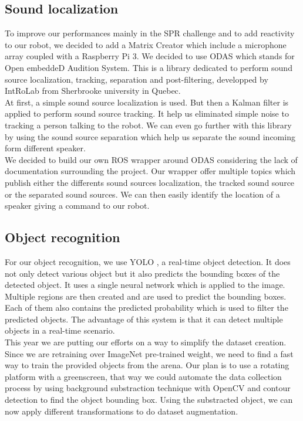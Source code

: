 \documentclass[runningheads,a4paper]{llncs}
\begin{document}
\subsection{Sound localization}
\tab To improve our performances mainly in the SPR challenge and to add reactivity to our robot, we decided to add a Matrix Creator which include a microphone array coupled with a Raspberry Pi 3. We decided to use ODAS  \cite{ODAS} which stands for Open embeddeD Audition System. This is a library dedicated to perform sound source localization, tracking, separation and post-filtering, developped by IntRoLab\cite{Introlab} from Sherbrooke university in Quebec.\\ 

At first, a simple sound source localization is used. But then a Kalman filter is applied to perform sound source tracking. It help us eliminated simple noise to tracking a person talking to the robot. We can even go further with this library by using the sound source separation which help us separate the sound incoming form different speaker.\\

We decided to build our own ROS wrapper around ODAS considering the lack of documentation surrounding the project. Our wrapper offer multiple topics which publish either the differents sound sources localization, the tracked sound source or the separated sound sources. We can then easily identify the location of a speaker giving a command to our robot.\\

\subsection{Object recognition}
\tab For our object recognition, we use YOLO \cite{yolo}, a real-time object detection. It does not only detect various object but it also predicts the bounding boxes of the detected object. It uses a single neural network which is applied to the image. Multiple regions are then created and are used to predict the bounding boxes. Each of them also contains the predicted probability which is used to filter the predicted objects. The advantage of this system is that it can detect multiple objects in a real-time scenario.\\

This year we are putting our efforts on a way to simplify the dataset creation. Since we are retraining over ImageNet pre-trained weight, we need to find a fast way to train the provided objects from the arena. Our plan is to use a rotating platform with a greenscreen, that way we could automate the data collection process by using background substraction technique with OpenCV and contour detection to find the object bounding box. Using the substracted object, we can now apply different transformations to do dataset augmentation. 
 
\end{document}
